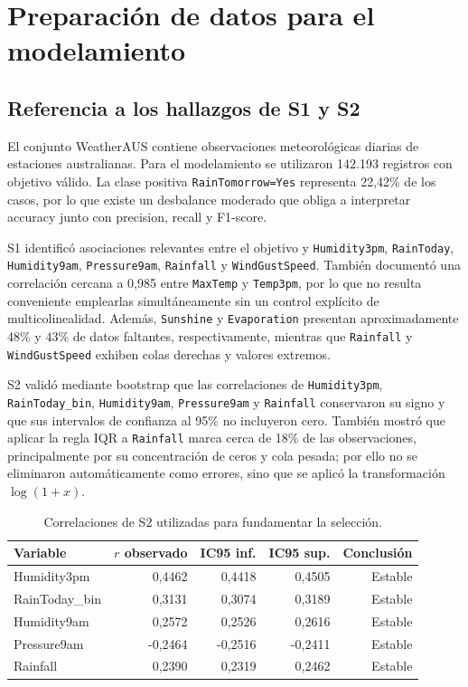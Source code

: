 \documentclass[11pt,a4paper]{article}
\begin{document}
\tableofcontents
\newpage

\section{Preparación de datos para el modelamiento}

\subsection{Referencia a los hallazgos de S1 y S2}
El conjunto WeatherAUS contiene observaciones meteorológicas diarias de estaciones australianas. Para el modelamiento se utilizaron 142.193 registros con objetivo válido. La clase positiva \texttt{RainTomorrow=Yes} representa 22,42\% de los casos, por lo que existe un desbalance moderado que obliga a interpretar accuracy junto con precision, recall y F1-score.

S1 identificó asociaciones relevantes entre el objetivo y \texttt{Humidity3pm}, \texttt{RainToday}, \texttt{Humidity9am}, \texttt{Pressure9am}, \texttt{Rainfall} y \texttt{WindGustSpeed}. También documentó una correlación cercana a 0,985 entre \texttt{MaxTemp} y \texttt{Temp3pm}, por lo que no resulta conveniente emplearlas simultáneamente sin un control explícito de multicolinealidad. Además, \texttt{Sunshine} y \texttt{Evaporation} presentan aproximadamente 48\% y 43\% de datos faltantes, respectivamente, mientras que \texttt{Rainfall} y \texttt{WindGustSpeed} exhiben colas derechas y valores extremos.

S2 validó mediante bootstrap que las correlaciones de \texttt{Humidity3pm}, \texttt{RainToday\_bin}, \texttt{Humidity9am}, \texttt{Pressure9am} y \texttt{Rainfall} conservaron su signo y que sus intervalos de confianza al 95\% no incluyeron cero. También mostró que aplicar la regla IQR a \texttt{Rainfall} marca cerca de 18\% de las observaciones, principalmente por su concentración de ceros y cola pesada; por ello no se eliminaron automáticamente como errores, sino que se aplicó la transformación \(\log(1+x)\).

\begin{table}[H]
\centering
\caption{Correlaciones de S2 utilizadas para fundamentar la selección.}
\small
\begin{tabular}{lrrrr}
\toprule
Variable & $r$ observado & IC95 inf. & IC95 sup. & Conclusión \\
\midrule
Humidity3pm   &  0,4462 &  0,4418 &  0,4505 & Estable \\
RainToday\_bin & 0,3131 &  0,3074 &  0,3189 & Estable \\
Humidity9am   &  0,2572 &  0,2526 &  0,2616 & Estable \\
Pressure9am   & -0,2464 & -0,2516 & -0,2411 & Estable \\
Rainfall      &  0,2390 &  0,2319 &  0,2462 & Estable \\
\bottomrule
\end{tabular}
\end{table}
\end{document}
